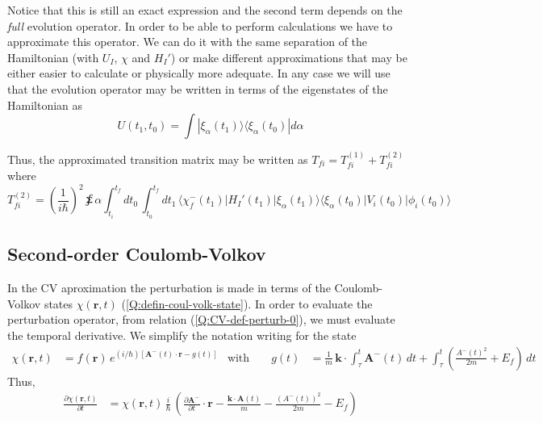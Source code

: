 Notice that this is still an exact expression and the second term depends on the \emph{full} evolution operator. 
In order to be able to perform calculations we have to approximate this operator. We can do it with the same separation of the Hamiltonian (with $U_{I}$, $\chi$ and $H_{I}'$) or make different approximations that may be either easier to calculate or physically more adequate. In any case we will use that the evolution operator may be written in terms of the eigenstates of the Hamiltonian as
\begin{equation}
  \label{Q:oper-evol-autoestados}
  U(t_{1},t_{0})= \int |\xi_{\alpha}(t_{1})\rangle\langle \xi_{\alpha}(t_{0})| d\alpha 
\end{equation}

 Thus, the approximated transition matrix may be written as
$T_{fi} = T_{fi}^{(1)} + T_{fi}^{(2)}$ where
\begin{equation} \label{Q:CV-2or-1}
T_{fi}^{(2)}= \left( \frac{1}{i \hbar} \right)^{2} \sumint{\alpha} \int_{t_{i}}^{t_{f}} d t_{0} \, \int_{t_{0}}^{t_{f}} d t_{1} \,\big\langle \chi_{f}^{-}(t_{1}) \big| H_{I}'(t_{1}) \big|\xi_{\alpha}(t_{1})\big\rangle \big\langle \xi_{\alpha}(t_{0})\big|  V_{i}(t_{0}) \big| \phi_{i}(t_{0}) \big\rangle 
\end{equation}

\subsection{Second-order Coulomb-Volkov}
\label{S:second-order-CV}

In the CV aproximation the perturbation is made in terms of the Coulomb-Volkov states $\chi (\bm{r},t)$ (\ref{Q:defin-coul-volk-state}). In order to evaluate the perturbation operator, from relation (\ref{Q:CV-def-perturb-0}), we must evaluate the temporal derivative. We simplify the notation writing for the state
\begin{align*}
  \chi (\bm{r},t) &= f(\bm{r})\, e^{(i/\hbar) [\bm{A}^{-}(t)\cdot \bm{r} - g(t)]}
  &\text{with } &&
  g(t)&=  \frac{1}{m}\, \bm{k} \cdot \int_{\tau}^{t}  \bm{A}^{-}(t)\, dt + \int_{\tau}^{t} \left( \frac{A^{-}(t)^{2}}{2m} + E_{f} \right) \, dt 
\end{align*}
Thus,
\begin{align}
 \frac{\partial \chi (\bm{r},t)}{\partial t} &= \chi (\bm{r},t) \, \frac{i}{\hbar} \, \left( \frac{\partial \bm{A}^{-}}{\partial t}\cdot \bm{r} - \frac{\bm{k}\cdot \bm{A}(t)}{m} - \frac{\left( A^{-}(t) \right)^{2}}{2m} - E_{f}  \right)
\end{align}

